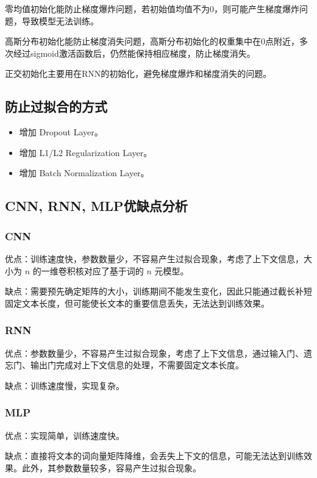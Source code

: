 \documentclass[12pt,a4paper]{article}
\begin{document}
零均值初始化能防止梯度爆炸问题，若初始值均值不为0，则可能产生梯度爆炸问题，导致模型无法训练。

高斯分布初始化能防止梯度消失问题，高斯分布初始化的权重集中在0点附近，多次经过sigmoid激活函数后，仍然能保持相应梯度，防止梯度消失。

正交初始化主要用在RNN的初始化，避免梯度爆炸和梯度消失的问题。

\subsection{防止过拟合的方式}

\begin{itemize}
    \item 增加 Dropout Layer。
    \item 增加 L1/L2 Regularization Layer。
    \item 增加 Batch Normalization Layer。
\end{itemize}

\subsection{CNN, RNN, MLP优缺点分析}

\subsubsection{CNN}

优点：训练速度快，参数数量少，不容易产生过拟合现象，考虑了上下文信息，大小为 $n$ 的一维卷积核对应了基于词的 $n$ 元模型。

缺点：需要预先确定矩阵的大小，训练期间不能发生变化，因此只能通过截长补短固定文本长度，但可能使长文本的重要信息丢失，无法达到训练效果。

\subsubsection{RNN}

优点：参数数量少，不容易产生过拟合现象，考虑了上下文信息，通过输入门、遗忘门、输出门完成对上下文信息的处理，不需要固定文本长度。

缺点：训练速度慢，实现复杂。

\subsubsection{MLP}

优点：实现简单，训练速度快。

缺点：直接将文本的词向量矩阵降维，会丢失上下文的信息，可能无法达到训练效果。此外，其参数数量较多，容易产生过拟合现象。
\end{document}
